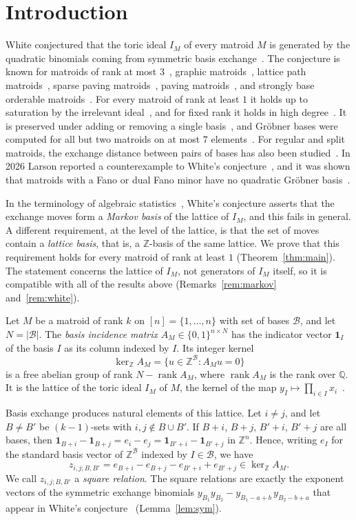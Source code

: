 \documentclass[11pt,a4paper]{article}
\theoremstyle{plain}
\theoremstyle{definition}
\newcommand{\Z}{\mathbb Z}
\newcommand{\AM}{A_M}
\newcommand{\kerZ}{\ker_{\Z}\!A_M}
\newcommand{\bs}{\mathcal B}
\newcommand{\rank}{\operatorname{rank}}
\newcommand{\ind}{\mathbf 1}
\begin{document}
\section{Introduction}\label{sec:intro}
White conjectured that the toric ideal $I_M$ of every matroid $M$ is generated by the quadratic binomials coming from symmetric basis exchange~\cite{W80}. The conjecture is known for matroids of rank at most $3$~\cite{Ka10}, graphic matroids~\cite{Bl08}, lattice path matroids~\cite{Sc11}, sparse paving matroids~\cite{Bo13}, paving matroids~\cite{YY25}, and strongly base orderable matroids~\cite{LM14}. For every matroid of rank at least $1$ it holds up to saturation by the irrelevant ideal~\cite{LM14}, and for fixed rank it holds in high degree~\cite{La21}. It is preserved under adding or removing a single basis~\cite{HMW25}, and Gr\"obner bases were computed for all but two matroids on at most $7$ elements~\cite{HHKS20}. For regular and split matroids, the exchange distance between pairs of bases has also been studied~\cite{BMS24,BS24}. In 2026 Larson reported a counterexample to White's conjecture~\cite{Lar26}, and it was shown that matroids with a Fano or dual Fano minor have no quadratic Gr\"obner basis~\cite{BCLLM26,DFMR26}.

In the terminology of algebraic statistics~\cite{DS98}, White's conjecture asserts that the exchange moves form a \emph{Markov basis} of the lattice of $I_M$, and this fails in general. A different requirement, at the level of the lattice, is that the set of moves contain a \emph{lattice basis}, that is, a $\Z$-basis of the same lattice. We prove that this requirement holds for every matroid of rank at least $1$ (Theorem~\ref{thm:main}). The statement concerns the lattice of $I_M$, not generators of $I_M$ itself, so it is compatible with all of the results above (Remarks~\ref{rem:markov} and~\ref{rem:white}).

Let $M$ be a matroid of rank $k$ on $[n]=\{1,\dots,n\}$ with set of bases $\bs$, and let $N=|\bs|$. The \emph{basis incidence matrix} $\AM\in\{0,1\}^{n\times N}$ has the indicator vector $\ind_I$ of the basis $I$ as its column indexed by $I$. Its integer kernel
\[
\kerZ=\{u\in\Z^{\bs}:\AM u=0\}
\]
is a free abelian group of rank $N-\rank\AM$, where $\rank\AM$ is the rank over $\mathbb Q$. It is the lattice of the toric ideal $I_M$ of $M$, the kernel of the map $y_I\mapsto\prod_{i\in I}x_i$~\cite{W77,St96}.

Basis exchange produces natural elements of this lattice. Let $i\ne j$, and let $B\ne B'$ be $(k-1)$-sets with $i,j\notin B\cup B'$. If $B+i$, $B+j$, $B'+i$, $B'+j$ are all bases, then $\ind_{B+i}-\ind_{B+j}=e_i-e_j=\ind_{B'+i}-\ind_{B'+j}$ in $\Z^n$. Hence, writing $e_I$ for the standard basis vector of $\Z^{\bs}$ indexed by $I\in\bs$, we have
\[
z_{i,j;B,B'}=e_{B+i}-e_{B+j}-e_{B'+i}+e_{B'+j}\in\kerZ .
\]
We call $z_{i,j;B,B'}$ a \emph{square relation}. The square relations are exactly the exponent vectors of the symmetric exchange binomials $y_{B_1}y_{B_2}-y_{B_1-a+b}\,y_{B_2-b+a}$ that appear in White's conjecture~\cite{W80} (Lemma~\ref{lem:sym}).
\end{document}
